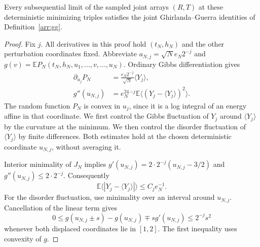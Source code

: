 \begin{lemma}
\label{upper:gg}
Every subsequential limit of the sampled joint arrays $(R,T)$
at these deterministic minimizing triples satisfies the joint
Ghirlanda--Guerra identities of Definition~\ref{arr:gg}.
\end{lemma}

\begin{proof}
Fix $j$. All derivatives in this proof hold $(t_N,h_N)$ and
the other perturbation coordinates fixed. Abbreviate
$a_{N,j}=\sqrt N e_N2^{-j}$ and
$g(v)=\mathbb E P_N(t_N,h_N,u_1,\ldots,v,\ldots,u_N)$.
Ordinary Gibbs differentiation gives
\begin{align}
\label{upper:u-derivatives}
 \partial_{u_j}P_N&=\frac{e_N2^{-j}}{\sqrt N}
                         \langle Y_j\rangle,\\
 g''(u_{N,j})&=e_N^24^{-j}
   \mathbb E\langle(Y_j-\langle Y_j\rangle)^2\rangle.
\end{align}
The random function $P_N$ is convex in $u_j$, since it is
a log integral of an energy affine in that coordinate.
We first control the Gibbs fluctuation of $Y_j$ around
$\langle Y_j\rangle$ by the curvature at the minimum. We then
control the disorder fluctuation of $\langle Y_j\rangle$ by
finite differences. Both estimates hold at the chosen deterministic
coordinate $u_{N,j}$, without averaging it.

Interior minimality of $J_N$ implies
$g'(u_{N,j})=2\cdot2^{-j}(u_{N,j}-3/2)$ and
$g''(u_{N,j})\le2\cdot2^{-j}$. Consequently
\begin{equation}
\label{upper:thermal}
 \mathbb E\langle|Y_j-\langle Y_j\rangle|\rangle
 \le C_j e_N^{-1}.
\end{equation}
For the disorder fluctuation, use minimality over an interval
around $u_{N,j}$. Cancellation of the linear term gives
\begin{equation}
\label{upper:taylor}
 0\le g(u_{N,j}\pm s)-g(u_{N,j})
           \mp s g'(u_{N,j})\le2^{-j}s^2
\end{equation}
whenever both displaced coordinates lie in $[1,2]$.
The first inequality uses convexity of $g$.


\end{proof}
